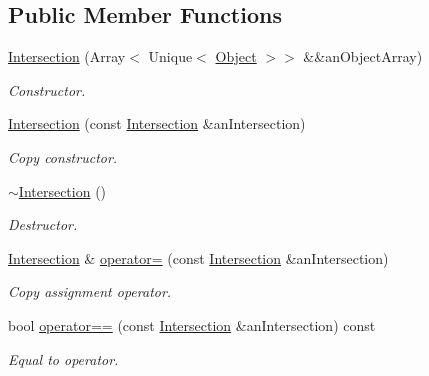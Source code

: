 \subsection*{Public Member Functions}
\begin{DoxyCompactItemize}
\item 
\hyperlink{classlibrary_1_1math_1_1geom_1_1d3_1_1_intersection_afbaef540a058ccc7e58f1be2585304a9}{Intersection} (Array$<$ Unique$<$ \hyperlink{classlibrary_1_1math_1_1geom_1_1d3_1_1_object}{Object} $>$$>$ \&\&an\+Object\+Array)
\begin{DoxyCompactList}\small\item\em Constructor. \end{DoxyCompactList}\item 
\hyperlink{classlibrary_1_1math_1_1geom_1_1d3_1_1_intersection_a6eacd360660163afafb78178d25ad714}{Intersection} (const \hyperlink{classlibrary_1_1math_1_1geom_1_1d3_1_1_intersection}{Intersection} \&an\+Intersection)
\begin{DoxyCompactList}\small\item\em Copy constructor. \end{DoxyCompactList}\item 
\hyperlink{classlibrary_1_1math_1_1geom_1_1d3_1_1_intersection_af2c13f6bc69d8271600d0f30848dd64b}{$\sim$\+Intersection} ()
\begin{DoxyCompactList}\small\item\em Destructor. \end{DoxyCompactList}\item 
\hyperlink{classlibrary_1_1math_1_1geom_1_1d3_1_1_intersection}{Intersection} \& \hyperlink{classlibrary_1_1math_1_1geom_1_1d3_1_1_intersection_a41ca5e5ac6fe7bc3f26f516acde56be8}{operator=} (const \hyperlink{classlibrary_1_1math_1_1geom_1_1d3_1_1_intersection}{Intersection} \&an\+Intersection)
\begin{DoxyCompactList}\small\item\em Copy assignment operator. \end{DoxyCompactList}\item 
bool \hyperlink{classlibrary_1_1math_1_1geom_1_1d3_1_1_intersection_a4205e2dcace3faa8abfeb829423d0baf}{operator==} (const \hyperlink{classlibrary_1_1math_1_1geom_1_1d3_1_1_intersection}{Intersection} \&an\+Intersection) const
\begin{DoxyCompactList}\small\item\em Equal to operator. \end{DoxyCompactList}\item 
$$
\end{DoxyCompactItemize}
